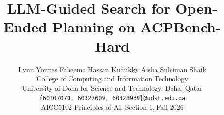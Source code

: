 \documentclass{article}
\title{LLM-Guided Search for Open-Ended Planning on ACPBench-Hard}
\author{%
  Lynn Younes \quad Faheema Hassan Kudukky \quad Aisha Suleiman Shaik \\
  College of Computing and Information Technology\\
  University of Doha for Science and Technology, Doha, Qatar \\
  \texttt{\{60107070, 60327609, 60328939\}@udst.edu.qa} \\
  AICC5102 Principles of AI, Section 1, Fall 2026
}
\begin{document}
\maketitle












\nocite{kokel2025acpbenchhard,acpbench_code}



\clearpage
\appendix


\clearpage %




\end{document}
